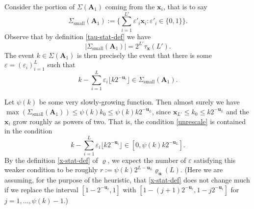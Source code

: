 \documentclass[11pt,reqno]{amsart}
\numberwithin{equation}{section}
\theoremstyle{definition}
\theoremstyle{remark}
\newcommand{\mbf}{\mathbf}
\newcommand{\eps}{\varepsilon}
\renewcommand{\le}{\leqslant}
\def\sml{\operatorname{small}}
\begin{document}
Consider the portion of $\Sigma(\mbf{A}_1)$ coming from the $\mbf{x}_i$, that is to say 
\[ \Sigma_{\sml}(\mbf{A}_1) := \{ \sum_{i = 1}^{L'} \eps'_i \mbf{x}_i : \eps'_i \in \{0,1\}\}.\]
Observe that by definition \cref{tau-stat-def} we have
\begin{equation}\label{sig-s-small} |\Sigma_{\sml}(\mbf{A}_1)| = 2^{L'} \tau_{\mbf{x}}(L').\end{equation}
The event $k \in \Sigma(\mbf{A}_1)$ is then precisely the event that there is some $\eps = (\eps_i)_{i = 1}^L$ such that 
\begin{equation}\label{unrescale}  k - \sum_{i = 1}^L \eps_i \lfloor k 2^{-\mbf{u}_i}\rfloor \in \Sigma_{\sml}(\mbf{A}_1).\end{equation} 

Let $\psi(k)$ be some very slowly-growing function. Then almost surely we have $\max (\Sigma_{\sml}(\mbf{A}_1)) \le \psi(k) k_0 \le \psi(k) k 2^{-\mbf{u}_L}$, since $\mbf{x}_{L'} \le k_0 \le k 2^{-\mbf{u}_L}$ and the $\mbf{x}_i$ grow roughly as powers of two. That is, the condition \cref{unrescale} is contained in the condition
 \begin{equation}\label{rescale-2} k - \sum_{i = 1}^L \eps_i \lfloor k 2^{-\mbf{u}_i}\rfloor  \in [0, \psi(k) k 2^{-\mbf{u}_L}].\end{equation} 
By the definition \cref{x-stat-def} of $\varrho$, we expect the number of $\eps$ satisfying this weaker condition to be roughly $r:=  \psi(k) 2^{L - \mbf{u}_L} \varrho_{\mbf{u}}(L)$. (Here we are assuming, for the purpose of the heuristic, that \cref{x-stat-def} does not change much if we replace the interval $[1 - 2^{-\mbf{u}_{\ell}}, 1]$ with $[1 - (j+1) 2^{-\mbf{u}_{\ell}}, 1 - j 2^{-\mbf{u}_{\ell}}]$ for $j = 1,\dots, \psi(k) - 1$.)
\end{document}
